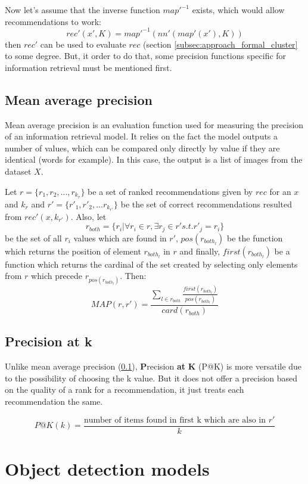 Now let's assume that the inverse function $map'^{-1}$ exists, which would allow recommendations to work:
$$ rec'(x', K) = map'^{-1}(nn'(map'(x'), K)) $$
then $rec'$ can be used to evaluate $rec$ (section \ref{subsec:approach_formal_cluster} to some degree. But, it order to do that, some precision functions specific for information retrieval must be mentioned first.

\subsection{Mean average precision}
\label{subsec:results_eval_map}

Mean average precision is an evaluation function used for measuring the precision of an information retrieval model. It relies on the fact the model outputs a number of values, which can be compared only directly by value if they are identical (words for example). In this case, the output is a list of images from the dataset $X$. 

Let $r = \{r_1, r_2, ..., r_{k_r}\} $ be a set of ranked recommendations given by $rec$ for an $x$ and $k_r$ and $r' = \{r'_1, r'_2, ... r_{k_{r'}}\} $ be the set of correct recommendations resulted from $rec'(x, k_{r'})$. Also, let 
$$ r_{both} = \{ r_i | \forall r_i \in r, \exists r_j \in r' s.t. r'_j = r_i \} $$ 
be the set of all $r_i$ values which are found in $r'$, $pos(r_{both_l})$ be the function which returns the position of element $r_{both_l}$ in $r$ and finally, $first(r_{both_l})$ be a function which returns the cardinal of the set created by selecting only elements from $r$ which precede $r_{pos(r_{both_l})}$. Then:
$$ MAP(r, r') = \frac{\sum_{l \in r_{both}}{\frac{first(r_{both_l})}{pos(r_{both_l})}}}{card(r_{both})} $$

\subsection{Precision at k}
\label{subsec:results_eval_patk}

Unlike mean average precision (\ref{subsec:results_eval_map}), \textbf{P}recision \textbf{at} \textbf{K} (P@K) is more versatile due to the possibility of choosing the k value. But it does not offer a precision based on the quality of a rank for a recommendation, it just treats each recommendation the same.

$$P@K(k) = \frac{\textrm{number of items found in first k which are also in } r'}{k} $$

\section{Object detection models}
\label{sec:results_obj}

